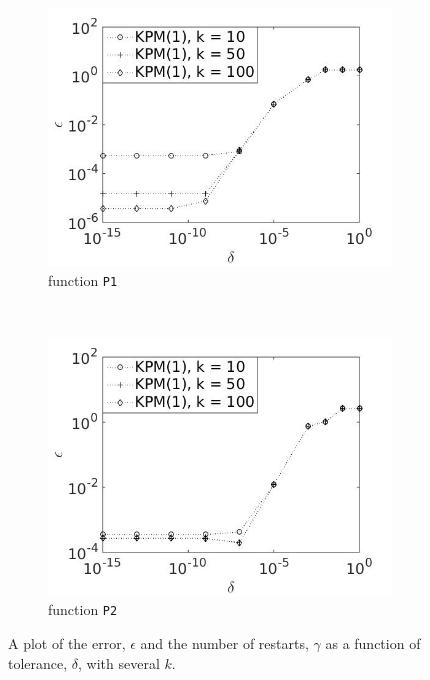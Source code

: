 \begin{figure}[H]
\begin{subfigure}[b]{0.45\textwidth}
                \includegraphics[width=\textwidth]{fig/s22errvstol1k}
                \caption{function \texttt{P1}}
                \label{fig:errtol1k}
        \end{subfigure}
~
        \begin{subfigure}[b]{0.45\textwidth}
                \includegraphics[width=\textwidth]{fig/s23errvstol2k}
                \caption{ function \texttt{P2}}
                \label{fig:errtol2k}
        \end{subfigure}
        \caption{A plot of the error, $\epsilon$ and the number of restarts, $\gamma$ as a function of tolerance, $\delta$, with several $k$.} \label{fig:errtolk}
\end{figure}

\newpage